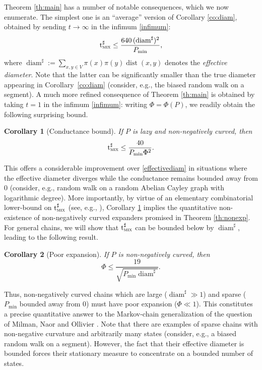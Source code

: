 \documentclass[10pt]{amsart}
\newtheorem{corollary}{Corollary}
\theoremstyle{definition}
\newcommand{\tmix}{\mathrm{t}_{\textup{\textsc{mix}}}}
\newcommand{\pmin}{P_{\mathrm{min}}}
\DeclareMathOperator{\diam}{diam}
\DeclareMathOperator{\dist}{dist}
\begin{document}
Theorem \ref{th:main} has a number of notable consequences, which we now enumerate. The simplest one is an ``average'' version of Corollary \ref{co:diam}, obtained by sending $t\to\infty$ in the infimum \eqref{infimum}:
\begin{equation}
\label{effectivediam}
\tmix^\sharp \le \frac{640\,(\diam^\sharp)^2}{\pmin},
\end{equation}
where $
\diam^\sharp := \sum_{x,y\in V}\pi(x)\pi(y)\dist(x,y)
$ denotes the \emph{effective diameter}. Note that the latter can be significantly smaller than the true diameter appearing in Corollary~\ref{co:diam} (consider, e.g., the biased random walk on a segment). A much more refined consequence of Theorem \ref{th:main} is obtained by taking $t=1$ in the infimum \eqref{infimum}: writing $\Phi=\Phi(P)$, we readily obtain the following surprising bound.
\begin{corollary}[Conductance bound]\label{co:conductance}If $P$ is lazy and non-negatively curved, then
\begin{equation*}
\tmix^\sharp \le \frac{40}{\pmin\Phi^2}.
\end{equation*}
\end{corollary}
This offers a considerable improvement over \eqref{effectivediam} in situations where the effective diameter diverges while the conductance remains bounded away from $0$ (consider, e.g., random walk on a random Abelian Cayley graph with logarithmic degree). More importantly, by virtue of an elementary combinatorial lower-bound on $\tmix^\sharp$ (see, e.g., \cite[\S 7.1.1]{MR3726904}), Corollary \ref{co:conductance} implies the quantitative non-existence of non-negatively curved expanders promised in Theorem \ref{th:nonexp}. For general chains, we will show that $\tmix^\sharp$ can be bounded below by $\diam^\sharp$, leading to the following result.
\begin{corollary}[Poor expansion]\label{co:expansion}If $P$ is non-negatively curved, then
\begin{equation*}
\Phi \le \frac{19}{\sqrt{\pmin\diam^\sharp}}.
\end{equation*}
\end{corollary}
Thus, non-negatively curved chains which are large ($\diam^\sharp\gg 1$) and sparse ($\pmin$ bounded away from $0$) must have poor expansion ($\Phi\ll 1$). This constitutes a precise quantitative answer to the Markov-chain generalization of the question of Milman, Naor and Ollivier \cite[Probl.\,T]{ollivier2010survey}. Note that there are examples of sparse chains with non-negative curvature and arbitrarily many states (consider, e.g., a biased random walk on a segment). However, the fact that their effective diameter is bounded forces their stationary measure to concentrate on a bounded number of states.
\end{document}
